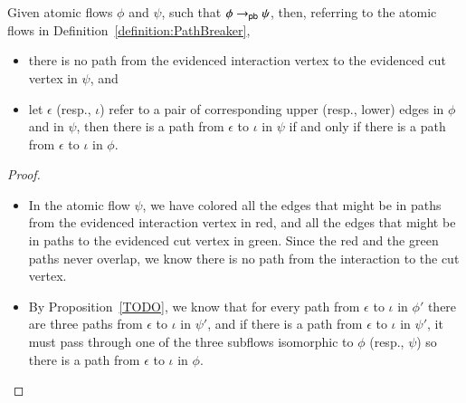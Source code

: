 
\begin{proposition}\label{proposition:PathBreak}
Given atomic flows $\phi$ and $\psi$, such that $\phi\to_{\mathsf{pb}}\psi$, then, referring to the atomic flows in Definition~\vref{definition:PathBreaker},
\begin{itemize}
 \item there is no path from the evidenced interaction vertex to the evidenced cut vertex in $\psi$, and
 \item let $\epsilon$ (resp., $\iota$) refer to a pair of corresponding upper (resp., lower) edges in $\phi$ and in $\psi$, then there is a path from $\epsilon$ to $\iota$ in $\psi$ if and only if there is a path from $\epsilon$ to $\iota$ in $\phi$.
\end{itemize}
\end{proposition}


\begin{proof}
\begin{itemize}
	\item In the atomic flow $\psi$, we have colored all the edges that might be in paths from the evidenced interaction vertex in red, and all the edges that might be in paths to the evidenced cut vertex in green. Since the red and the green paths never overlap, we know there is no path from the interaction to the cut vertex.
	\item By Proposition~\vref{TODO}, we know that for every path from $\epsilon$ to $\iota$ in $\phi'$ there are three paths from $\epsilon$ to $\iota$ in $\psi'$, and if there is a path from $\epsilon$ to $\iota$ in $\psi'$, it must pass through one of the three subflows isomorphic to $\phi$ (resp., $\psi$) so there is a path from $\epsilon$ to $\iota$ in $\phi$.
\end{itemize}
\end{proof}
